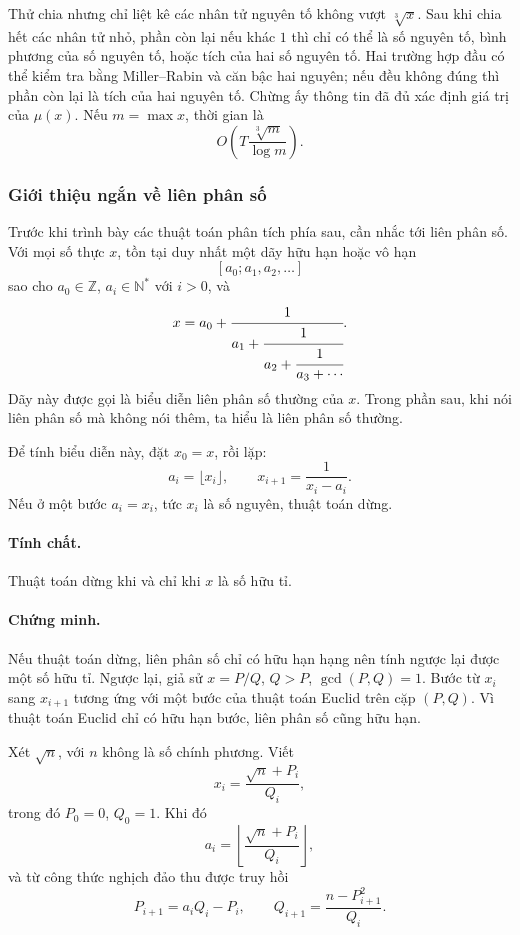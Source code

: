 \documentclass[11pt]{article}
\begin{document}
Thử chia nhưng chỉ liệt kê các nhân tử nguyên tố không vượt \(\sqrt[3]{x}\).
Sau khi chia hết các nhân tử nhỏ, phần còn lại nếu khác \(1\) thì chỉ có thể
là số nguyên tố, bình phương của số nguyên tố, hoặc tích của hai số nguyên tố.
Hai trường hợp đầu có thể kiểm tra bằng Miller--Rabin và căn bậc hai nguyên;
nếu đều không đúng thì phần còn lại là tích của hai nguyên tố. Chừng ấy thông
tin đã đủ xác định giá trị của \(\mu(x)\). Nếu \(m=\max x\), thời gian là
\[
  O\left(T\frac{\sqrt[3]m}{\log m}\right).
\]

\subsubsection{Giới thiệu ngắn về liên phân số}

Trước khi trình bày các thuật toán phân tích phía sau, cần nhắc tới liên phân
số. Với mọi số thực \(x\), tồn tại duy nhất một dãy hữu hạn hoặc vô hạn
\[
  [a_0;a_1,a_2,\ldots]
\]
sao cho \(a_0\in\mathbb Z\), \(a_i\in\mathbb N^*\) với \(i>0\), và
\[
  x=a_0+\cfrac1{a_1+\cfrac1{a_2+\cfrac1{a_3+\cdots}}}.
\]
Dãy này được gọi là biểu diễn liên phân số thường của \(x\). Trong phần sau,
khi nói liên phân số mà không nói thêm, ta hiểu là liên phân số thường.

Để tính biểu diễn này, đặt \(x_0=x\), rồi lặp:
\[
  a_i=\lfloor x_i\rfloor,\qquad
  x_{i+1}=\frac1{x_i-a_i}.
\]
Nếu ở một bước \(a_i=x_i\), tức \(x_i\) là số nguyên, thuật toán dừng.

\paragraph{Tính chất.}
Thuật toán dừng khi và chỉ khi \(x\) là số hữu tỉ.

\paragraph{Chứng minh.}
Nếu thuật toán dừng, liên phân số chỉ có hữu hạn hạng nên tính ngược lại được
một số hữu tỉ. Ngược lại, giả sử \(x=P/Q\), \(Q>P\), \(\gcd(P,Q)=1\). Bước từ
\(x_i\) sang \(x_{i+1}\) tương ứng với một bước của thuật toán Euclid trên cặp
\((P,Q)\). Vì thuật toán Euclid chỉ có hữu hạn bước, liên phân số cũng hữu hạn.

Xét \(\sqrt n\), với \(n\) không là số chính phương. Viết
\[
  x_i=\frac{\sqrt n+P_i}{Q_i},
\]
trong đó \(P_0=0\), \(Q_0=1\). Khi đó
\[
  a_i=\left\lfloor \frac{\sqrt n+P_i}{Q_i}\right\rfloor,
\]
và từ công thức nghịch đảo thu được truy hồi
\[
  P_{i+1}=a_iQ_i-P_i,\qquad
  Q_{i+1}=\frac{n-P_{i+1}^2}{Q_i}. \tag{1}
\]
\end{document}

